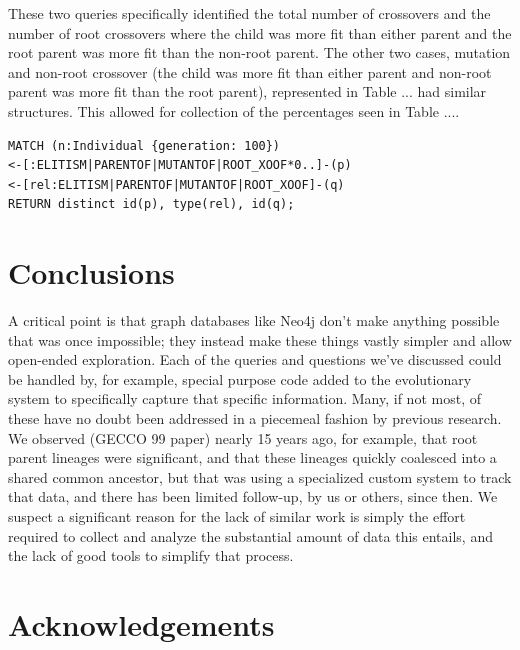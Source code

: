 \documentclass[12pt]{article}
\begin{document}
These two queries specifically identified the total number of crossovers and the number of root crossovers where the child was more fit than either parent and the root parent was more fit than the non-root parent. The other two cases, mutation and non-root crossover (the child was more fit than either parent and non-root parent was more fit than the root parent), represented in Table ... had similar structures. This allowed for collection of the percentages seen in Table .... 

\begin{verbatim}
MATCH (n:Individual {generation: 100})
<-[:ELITISM|PARENTOF|MUTANTOF|ROOT_XOOF*0..]-(p)
<-[rel:ELITISM|PARENTOF|MUTANTOF|ROOT_XOOF]-(q)
RETURN distinct id(p), type(rel), id(q);
\end{verbatim}


\section{Conclusions} \label{sec:conclusion}

A critical point is that graph databases like Neo4j don't make anything possible that was once impossible; they instead make these things vastly simpler and allow open-ended exploration. Each of the queries and questions we've discussed could be handled by, for example, special purpose code added to the evolutionary system to specifically capture that specific information. Many, if not most, of these have no doubt been addressed in a piecemeal fashion by previous research. We observed (GECCO 99 paper) nearly 15 years ago, for example, that root parent lineages were significant, and that these lineages quickly coalesced into a shared common ancestor, but that was using a specialized custom system to track that data, and there has been limited follow-up, by us or others, since then. We suspect a significant reason for the lack of similar work is simply the effort required to collect and analyze the substantial amount of data this entails, and the lack of good tools to simplify that process.

\section*{Acknowledgements}



\end{document}

